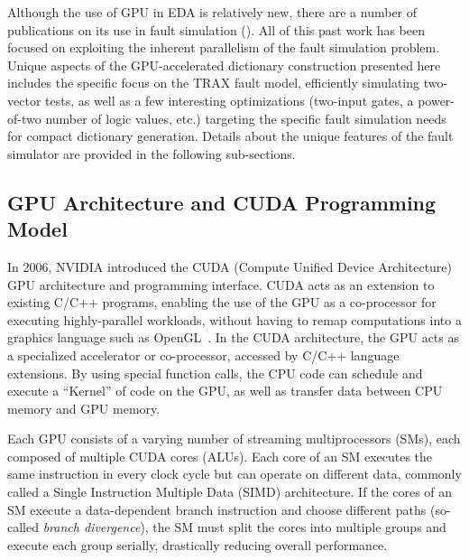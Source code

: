 Although the use of GPU in EDA is relatively new, there are a number of publications on its use in fault simulation (\cite{gulati09, parkes95, li10, kochte10, huaweili10, gulati08, chatterjee09}).
%
All of this past work has been focused on exploiting the inherent parallelism of the fault simulation problem.
%
Unique aspects of the GPU-accelerated dictionary construction presented here includes the specific focus on the TRAX fault model, efficiently simulating two-vector tests, as well as a few interesting optimizations (two-input gates, a power-of-two number of logic values, etc.) targeting the specific fault simulation needs for compact dictionary generation.
%
Details about the unique features of the fault simulator are provided in the following sub-sections.

\subsection{GPU Architecture and CUDA Programming Model}
\label{sec:trax_gpu_arch_cuda}
In 2006, NVIDIA introduced the CUDA (Compute Unified Device Architecture)~\cite{cuda} GPU architecture and programming interface.
%
CUDA acts as an extension to existing C/C++ programs, enabling the use of the GPU as a co-processor for executing highly-parallel workloads, without having to remap computations into a graphics language such as OpenGL~\cite{opengl}.
%
In the CUDA architecture, the GPU acts as a specialized accelerator or co-processor, accessed by C/C++ language extensions.
%
By using special function calls, the CPU code can schedule and execute a ``Kernel'' of code on the GPU, as well as transfer data between CPU memory and GPU memory.

Each GPU consists of a varying number of streaming multiprocessors (SMs), each composed of multiple CUDA cores (ALUs).
%
Each core of an SM executes the same instruction in every clock cycle but can operate on different data, commonly called a Single Instruction Multiple Data (SIMD) architecture.
%
If the cores of an SM execute a data-dependent branch instruction and choose different paths (so-called \textit{branch divergence}), the SM must split the cores into multiple groups and execute each group serially, drastically reducing overall performance.

